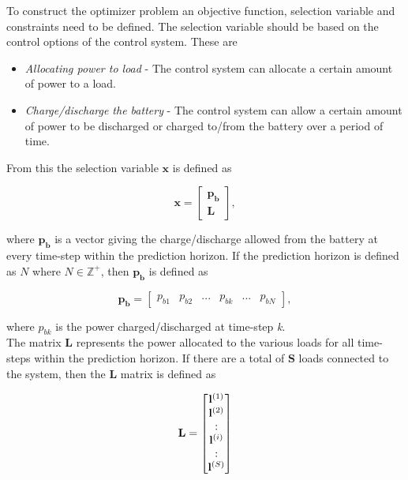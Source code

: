 To construct the optimizer problem an objective function, selection variable and constraints need to be defined. The selection variable should be based on the control options of the control system. These are 
\begin{itemize}
    \item \textit{Allocating power to load} -   The control system can allocate a certain amount of power to a load.
    \item \textit{Charge/discharge the battery} - The control system can allow a certain amount of power to be discharged or charged to/from the battery over a period of time.
\end{itemize}

From this the selection variable $\mathbf{x}$ is defined as 

\begin{equation}
    \mathbf{x} =    \begin{bmatrix}
                    \mathbf{p_b}\\
                    \mathbf{L}                    
                    \end{bmatrix},
\end{equation}

where $\mathbf{p_b}$ is a vector giving the charge/discharge allowed from the battery at every time-step within the prediction horizon. If the prediction horizon is defined as $N$ where $N\in\mathbb{Z^+}$, then $\mathbf{p_b}$ is defined as 

\begin{equation}
    \mathbf{p_b}    =   \begin{bmatrix}
                        p_{b1}&p_{b2}&...&p_{bk}&...&p_{bN}
                        \end{bmatrix},
\end{equation}

where $p_{bk}$ is the power charged/discharged at time-step \textit{k}.\\

The matrix $\mathbf{L}$ represents the power allocated to the various loads for all time-steps within the prediction horizon. If there are a total of $\mathbf{S}$ loads connected to the system, then the $\mathbf{L}$ matrix is defined as

\begin{equation}
    \mathbf{L} = \begin{bmatrix}
                        \mathbf{l}^{(1)} \\
                        \mathbf{l}^{(2)} \\
                        : \\
                        \mathbf{l}^{(i)} \\
                        : \\
                        \mathbf{l}^{(S)}
                    \end{bmatrix}\notag
\end{equation}

